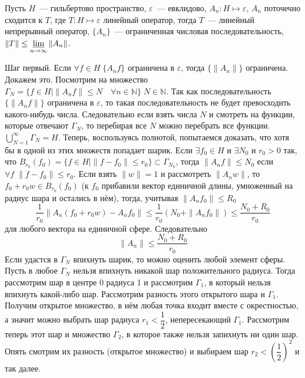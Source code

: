 \documentclass[14pt]{extarticle}
\begin{document}
\begin{Theor}
    Пусть $H$~--- гильбертово пространство, $\varepsilon$~--- евклидово, $A_n : H \mapsto \varepsilon$, $A_n$ поточечно сходится к $T$,
    где $T : H \mapsto \varepsilon$
    линейный оператор, тогда $T$~--- линейный непрерывный оператор, $\{A_n\}$~--- ограниченная числовая последовательность, $\|T\| \le \varliminf\limits_
    {n\to \infty}\|A_n\|$.
\end{Theor}
\begin{Proof}
    Шаг первый. Если $\forall f \in H\; \{A_nf\}$ ограничена в $\varepsilon$, тогда $\{\|A_n\|\}$ ограничена.
    Докажем это.
    Посмотрим на множество $\Gamma_N = \{f \in H \mid \|A_n f\| \le N \quad \forall n \in \mathbb N\}\; N \in \mathbb N$.
    Так как последовательность $\{\|A_nf\|\}$ ограничена в $\varepsilon$, то такая последовательность не будет превосходить какого-нибудь числа.
    Следовательно если взять числа $N$ и смотреть на функции, которые отвечают $\Gamma_N$, то перебирая все $N$ можно перебрать все функции.
    $\bigcup\limits_{N = 1}^\infty \Gamma_N = H$.
    Теперь, воспользуясь полнотой, попытаемся доказать, что хотя бы в одной из этих множеств попадает шарик.
    Если $\exists f_0 \in H$ и $\exists N_0$ и $r_0 > 0$ так, что $B_{r_0}(f_0)=\{f \in H \mid \|f - f_0\| \le r_0\} \subset \Gamma_{N_0}$, тогда $\|A_n f\| \le N_0$
    если $\forall f\; \|f - f_0\| \le r_0$.
    Если взять $\|w\| = 1$ и рассмотреть $\|A_n w\|$, то $f_0 + r_0 w \in B_{r_0}(f_0)$ (к $f_0$ прибавили вектор единичной длины, умноженный на радиус шара
    и остались в нём), тогда, учитывая $\|A_n f_0\| \le R_0$
    $$
    \dfrac{1}{r_0}\|A_n(f_0 + r_0 w) - A_n f_0\| \le \dfrac{1}{r_0}(N_0 + \|A_n f_0\|)\le \dfrac{N_0 + R_0}{r_0}
    $$
    для любого вектора на единичной сфере.
    Следовательно 
    $$
    \|A_n\| \le \dfrac{N_0 + R_0}{r_0}
    $$
    Если удастся в $\Gamma_N$ впихнуть шарик, то можно оценить любой элемент сферы.
    Пусть в любое $\Gamma_N$ нельзя впихнуть никакой шар положительного радиуса.
    Тогда рассмотрим шар в центре 0 радиуса 1 и рассмотрим $\Gamma_1$, в который нельзя впихнуть какой-либо шар.
    Рассмотрим разность этого открытого шара и $\Gamma_1$.
    Получим открытое множество, в нём любая точка входит вместе с окрестностью, а значит можно выбрать шар радиуса $r_1 < \dfrac12$, непересекающий $\Gamma_1$.
    Рассмотрим теперь этот шар и множество $\Gamma_2$, в которое также нельзя запихнуть ни один шар.
    Опять смотрим их разность (открытое множество) и выбираем шар $r_2 < \left(\dfrac12\right)^2$ и так далее.

\end{Proof}
\end{document}
